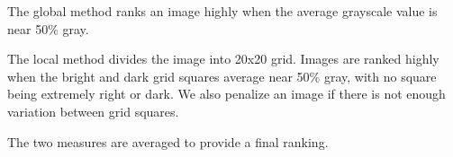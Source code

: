 \documentclass{article}
\begin{document}
The global method ranks an image highly when the average grayscale value is near 50\% gray.

The local method divides the image into 20x20 grid. Images are ranked highly when the bright and dark grid squares average near 50\% gray, with no square being extremely right or dark. We also penalize an image if there is not enough variation between grid squares.

The two measures are averaged to provide a final ranking.
   





\end{document}

